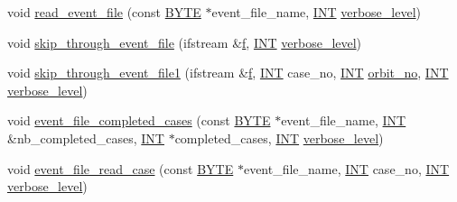 \begin{DoxyCompactItemize}
\item 
void \mbox{\hyperlink{classisomorph_a1dd2cbd2f5012b30f0d4bddf6f8cad2f}{read\+\_\+event\+\_\+file}} (const \mbox{\hyperlink{galois_8h_ab6cc7b4aeb6ea31aba2b3fbfc83ff5e6}{B\+Y\+TE}} $\ast$event\+\_\+file\+\_\+name, \mbox{\hyperlink{galois_8h_a09fddde158a3a20bd2dcadb609de11dc}{I\+NT}} \mbox{\hyperlink{simeon_8_c_a818073fbcc2f439e7c56952f67386122}{verbose\+\_\+level}})
\item 
void \mbox{\hyperlink{classisomorph_acdf47597968e29ce30e6b14c19660757}{skip\+\_\+through\+\_\+event\+\_\+file}} (ifstream \&\mbox{\hyperlink{alphabet2_8_c_a362077c979b0bb65159c603270e40f70}{f}}, \mbox{\hyperlink{galois_8h_a09fddde158a3a20bd2dcadb609de11dc}{I\+NT}} \mbox{\hyperlink{simeon_8_c_a818073fbcc2f439e7c56952f67386122}{verbose\+\_\+level}})
\item 
void \mbox{\hyperlink{classisomorph_ae8eaba3902c3e32c9f15f9288cb576c7}{skip\+\_\+through\+\_\+event\+\_\+file1}} (ifstream \&\mbox{\hyperlink{alphabet2_8_c_a362077c979b0bb65159c603270e40f70}{f}}, \mbox{\hyperlink{galois_8h_a09fddde158a3a20bd2dcadb609de11dc}{I\+NT}} case\+\_\+no, \mbox{\hyperlink{galois_8h_a09fddde158a3a20bd2dcadb609de11dc}{I\+NT}} \mbox{\hyperlink{classisomorph_aaed63873be4c25517da6003a6c215b2c}{orbit\+\_\+no}}, \mbox{\hyperlink{galois_8h_a09fddde158a3a20bd2dcadb609de11dc}{I\+NT}} \mbox{\hyperlink{simeon_8_c_a818073fbcc2f439e7c56952f67386122}{verbose\+\_\+level}})
\item 
void \mbox{\hyperlink{classisomorph_a2bb9a84e0b53e2eef9066d8faaab82b0}{event\+\_\+file\+\_\+completed\+\_\+cases}} (const \mbox{\hyperlink{galois_8h_ab6cc7b4aeb6ea31aba2b3fbfc83ff5e6}{B\+Y\+TE}} $\ast$event\+\_\+file\+\_\+name, \mbox{\hyperlink{galois_8h_a09fddde158a3a20bd2dcadb609de11dc}{I\+NT}} \&nb\+\_\+completed\+\_\+cases, \mbox{\hyperlink{galois_8h_a09fddde158a3a20bd2dcadb609de11dc}{I\+NT}} $\ast$completed\+\_\+cases, \mbox{\hyperlink{galois_8h_a09fddde158a3a20bd2dcadb609de11dc}{I\+NT}} \mbox{\hyperlink{simeon_8_c_a818073fbcc2f439e7c56952f67386122}{verbose\+\_\+level}})
\item 
void \mbox{\hyperlink{classisomorph_a9f56fe81a94a092bf96e615864efa029}{event\+\_\+file\+\_\+read\+\_\+case}} (const \mbox{\hyperlink{galois_8h_ab6cc7b4aeb6ea31aba2b3fbfc83ff5e6}{B\+Y\+TE}} $\ast$event\+\_\+file\+\_\+name, \mbox{\hyperlink{galois_8h_a09fddde158a3a20bd2dcadb609de11dc}{I\+NT}} case\+\_\+no, \mbox{\hyperlink{galois_8h_a09fddde158a3a20bd2dcadb609de11dc}{I\+NT}} \mbox{\hyperlink{simeon_8_c_a818073fbcc2f439e7c56952f67386122}{verbose\+\_\+level}})
\item 

\end{DoxyCompactItemize}
